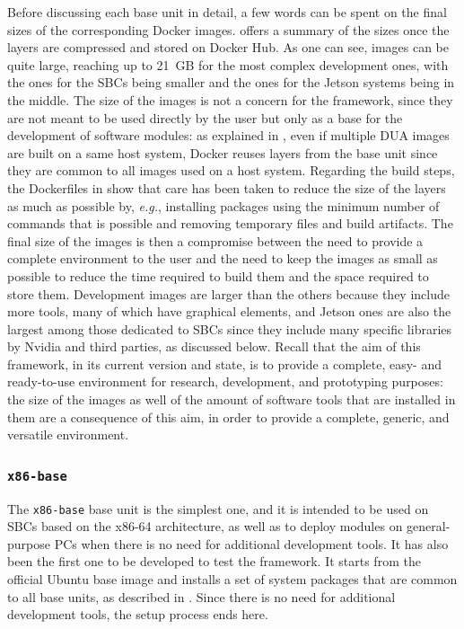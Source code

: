 Before discussing each base unit in detail, a few words can be spent on the final sizes of the corresponding Docker images.  offers a summary of the sizes once the layers are compressed and stored on Docker Hub. As one can see, images can be quite large, reaching up to \SI{21}{GB} for the most complex development ones, with the ones for the SBCs being smaller and the ones for the Jetson systems being in the middle. The size of the images is not a concern for the framework, since they are not meant to be used directly by the user but only as a base for the development of software modules: as explained in , even if multiple DUA images are built on a same host system, Docker reuses layers from the base unit since they are common to all images used on a host system. Regarding the build steps, the Dockerfiles in \cite{masocco_dua-foundation_nodate} show that care has been taken to reduce the size of the layers as much as possible by, \emph{e.g.}, installing packages using the minimum number of commands that is possible and removing temporary files and build artifacts. The final size of the images is then a compromise between the need to provide a complete environment to the user and the need to keep the images as small as possible to reduce the time required to build them and the space required to store them. Development images are larger than the others because they include more tools, many of which have graphical elements, and Jetson ones are also the largest among those dedicated to SBCs since they include many specific libraries by Nvidia and third parties, as discussed below. Recall that the aim of this framework, in its current version and state, is to provide a complete, easy- and ready-to-use environment for research, development, and prototyping purposes: the size of the images as well of the amount of software tools that are installed in them are a consequence of this aim, in order to provide a complete, generic, and versatile environment.

\subsubsection{\texttt{x86-base}}
\label{sec:dua_base_units_x86-base}
The \texttt{x86-base} base unit is the simplest one, and it is intended to be used on SBCs based on the x86-64 architecture, as well as to deploy modules on general-purpose PCs when there is no need for additional development tools. It has also been the first one to be developed to test the framework. It starts from the official Ubuntu base image and installs a set of system packages that are common to all base units, as described in . Since there is no need for additional development tools, the setup process ends here.

